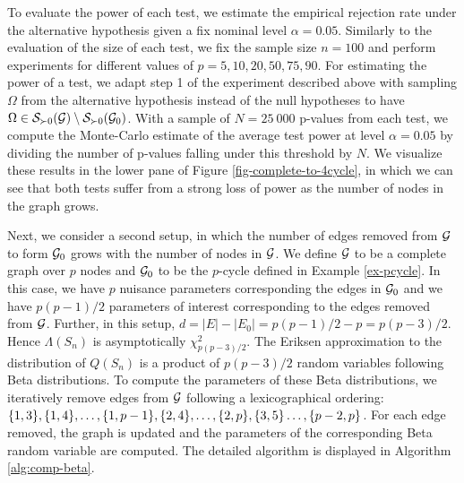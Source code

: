 To evaluate the power of each test, we estimate the empirical rejection rate under the alternative hypothesis given a fix nominal level $\alpha = 0.05$. Similarly to the evaluation of the size of each test, we fix the sample size $n = 100$ and perform experiments for different values of $p = 5, 10, 20, 50, 75, 90$. For estimating the power of a test, we adapt step 1 of the experiment described above with sampling $\Omega$ from the alternative hypothesis instead of the null hypotheses to have $\Omega \in {\mathcal{S}}_{\succ 0}({\mathcal{G}}) \setminus {\mathcal{S}}_{\succ 0}({\mathcal{G}}_0)$. With a sample of $N = 25\ 000$ p-values from each test, we compute the Monte-Carlo estimate of the average test power at level $\alpha = 0.05$ by dividing the number of p-values falling under this threshold by $N$. We visualize these results in the lower pane of Figure \ref{fig-complete-to-4cycle}, in which we can see that both tests suffer from a strong loss of power as the number of nodes in the graph grows.


Next, we consider a second setup, in which the number of edges removed from ${\mathcal{G}}$ to form ${\mathcal{G}}_0$ grows with the number of nodes in ${\mathcal{G}}$. We define ${\mathcal{G}}$ to be a complete graph over $p$ nodes and ${\mathcal{G}}_0$ to be the $p$-cycle defined in Example \ref{ex-pcycle}. In this case, we have $p$ nuisance parameters corresponding the edges in ${\mathcal{G}}_0$ and we have $p(p-1)/2$ parameters of interest corresponding to the edges removed from ${\mathcal{G}}$. Further, in this setup, $d = |E| - |E_0| = p(p-1)/2 - p = p(p-3)/2$. Hence $\Lambda(S_n)$ is asymptotically $\chi^2_{p(p-3)/2}$. The Eriksen approximation to the distribution of $Q(S_n)$ is a product of $p(p-3)/2$ random variables following Beta distributions. To compute the parameters of these Beta distributions, we iteratively remove edges from ${\mathcal{G}}$ following a lexicographical ordering: ${\left\{1, 3\right\}}, {\left\{1, 4\right\}}, \ldots, {\left\{1, p-1\right\}}, {\left\{2, 4\right\}}, \ldots, {\left\{2, p\right\}}, {\left\{3, 5\right\}} \ldots, {\left\{p-2, p\right\}}$. For each edge removed, the graph is updated and the parameters of the corresponding Beta random variable are computed. The detailed algorithm is displayed in Algorithm \ref{alg:comp-beta}.

